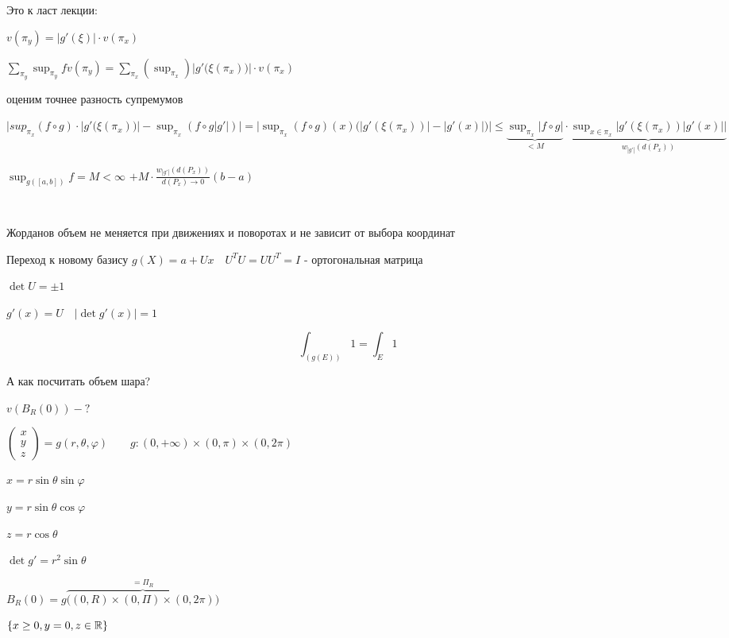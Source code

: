     Это к ласт лекции:

    $v(\pi_y) = |g'(\xi)| \cdot v(\pi_x)$

    $\sum_{\pi_y}\sup_{\pi_y} f v(\pi_y) = \sum_{\pi_x}(\sup_{\pi_x})\big|g'\big(\xi(\pi_x)\big)\big|\cdot v(\pi_x)$

    оценим точнее разность супремумов

    $\Big|sup_{\pi_x} (f\circ g)\cdot|g'\big(\xi(\pi_x)\big)| - \sup_{\pi_x}(f\circ g|g'|)\Big|=
    \Big|\sup_{\pi_x}(f\circ g)(x)\big(|g'(\xi(\pi_x))| - | g'(x) |\big) \Big| \le \underbrace{\sup_{\pi_x} |f\circ g|}_{<M}
    \cdot \underbrace{\sup_{x\in \pi_x} \big| g'(\xi(\pi_x))|g'(x)| \big|}_{w_{|g'|}(d(P_x))}
    $

    $\sup_{g([a,b])} f = M < \infty$ \quad $+ M \cdot \frac{w_{|g'|}(d(P_x))}{d(P_x)\to 0}(b-a)$  %

    \par $ $
    \pagebreak

    \begin{corollary}
        Жорданов объем не меняется при движениях и поворотах и не зависит от выбора координат

        Переход к новому базису $g(X) = a + Ux \quad U^TU = UU^T = I$ - ортогональная матрица

        $\det U = \pm 1$

        $g'(x) = U \quad |\det g'(x)| = 1$

        $$\int_{(g(E))} 1 = \int_E 1$$
    \end{corollary}

    А как посчитать объем шара?

    $v(B_R(0)) - ?$

    $\left(\begin{smallmatrix}
        x \\ y \\ z
    \end{smallmatrix}\right) = g(r, \theta, \varphi) \qquad g: (0, +\infty)\times(0, \pi)\times(0, 2\pi)$

    $x = r\sin\theta\sin\varphi$  %

    $y = r\sin\theta\cos\varphi$  %

    $z = r\cos\theta$

    $\det g' = r^2 \sin\theta$
    
    $B_R(0) = g\overbrace{\big((0, R)\times(0, \Pi)\times(0,2\pi)\big)}^{=\Pi_R}$

    $\{ x \ge 0, y = 0, z \in \mathbb{R} \}$

